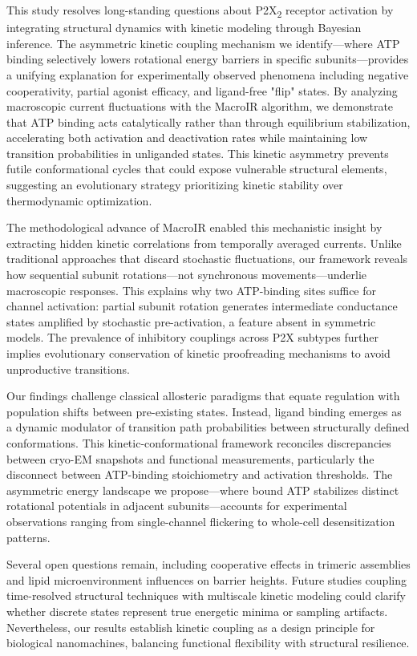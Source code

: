 \documentclass[a4paper,12pt]{article}
\begin{document}
	This study resolves long-standing questions about P2X\textsubscript{2} receptor activation by integrating structural dynamics with kinetic modeling through Bayesian inference. The asymmetric kinetic coupling mechanism we identify—where ATP binding selectively lowers rotational energy barriers in specific subunits—provides a unifying explanation for experimentally observed phenomena including negative cooperativity, partial agonist efficacy, and ligand-free "flip" states. By analyzing macroscopic current fluctuations with the MacroIR algorithm, we demonstrate that ATP binding acts catalytically rather than through equilibrium stabilization, accelerating both activation and deactivation rates while maintaining low transition probabilities in unliganded states. This kinetic asymmetry prevents futile conformational cycles that could expose vulnerable structural elements, suggesting an evolutionary strategy prioritizing kinetic stability over thermodynamic optimization.
	
	The methodological advance of MacroIR enabled this mechanistic insight by extracting hidden kinetic correlations from temporally averaged currents. Unlike traditional approaches that discard stochastic fluctuations, our framework reveals how sequential subunit rotations—not synchronous movements—underlie macroscopic responses. This explains why two ATP-binding sites suffice for channel activation: partial subunit rotation generates intermediate conductance states amplified by stochastic pre-activation, a feature absent in symmetric models. The prevalence of inhibitory couplings across P2X subtypes further implies evolutionary conservation of kinetic proofreading mechanisms to avoid unproductive transitions.
	
	Our findings challenge classical allosteric paradigms that equate regulation with population shifts between pre-existing states. Instead, ligand binding emerges as a dynamic modulator of transition path probabilities between structurally defined conformations. This kinetic-conformational framework reconciles discrepancies between cryo-EM snapshots and functional measurements, particularly the disconnect between ATP-binding stoichiometry and activation thresholds. The asymmetric energy landscape we propose—where bound ATP stabilizes distinct rotational potentials in adjacent subunits—accounts for experimental observations ranging from single-channel flickering to whole-cell desensitization patterns.
	
	Several open questions remain, including cooperative effects in trimeric assemblies and lipid microenvironment influences on barrier heights. Future studies coupling time-resolved structural techniques with multiscale kinetic modeling could clarify whether discrete states represent true energetic minima or sampling artifacts. Nevertheless, our results establish kinetic coupling as a design principle for biological nanomachines, balancing functional flexibility with structural resilience.
	
\end{document}
